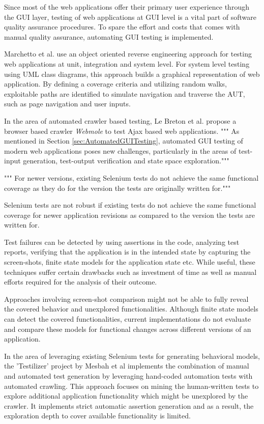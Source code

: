 Since most of the web applications offer their primary user experience through the GUI layer, testing of web applications at GUI level is a vital part of software quality assurance procedures. To spare the effort and costs that comes with manual quality assurance, automating GUI testing is implemented. 

Marchetto et al.\cite{Marchetto2006} use an object oriented reverse engineering approach for testing web applications at unit, integration and system level. For system level testing using UML class diagrams, this approach builds a graphical representation of web application. By defining a coverage criteria and utilizing random walks, exploitable paths are identified to simulate navigation and traverse the AUT, such as page navigation and user inputs.  

In the area of automated crawler based testing,  Le Breton et al. \cite{le2013automated} propose a browser based crawler \textit{Webmole} to test Ajax based web applications. 
""" 
As mentioned in Section \ref{sec:AutomatedGUITesting}, automated GUI testing of modern web applications poses new challenges, particularly in the areas of test-input generation, test-output verification and state space exploration."""

"""
For newer versions, existing Selenium tests do not achieve the same functional coverage as they do for the version the tests are originally written for."""

Selenium tests are not robust if existing tests do not achieve the same functional coverage for newer application revisions as compared to the version the tests are written for. 

Test failures can be detected by using assertions in the code, analyzing test reports, verifying that the application is in the intended state by capturing the screen-shots, finite state models for the application state etc. While useful, these techniques suffer certain drawbacks such as investment of time as well as manual efforts required for the analysis of their outcome. 

Approaches involving screen-shot comparison might not be able to fully reveal the covered behavior and unexplored functionalities. Although finite state models can detect the covered functionalities, current implementations do not evaluate and compare these models for functional changes across different versions of an application. 

In the area of leveraging existing Selenium tests for generating behavioral models, the 'Testilizer' project by Mesbah et al \cite{testilizer} implements the combination of manual and automated test generation by leveraging hand-coded automation tests with automated crawling. This approach focuses on mining the human-written tests to explore additional application functionality which might be unexplored by the crawler. It implements strict automatic assertion generation and as a result, the exploration depth to cover available functionality is limited. 

